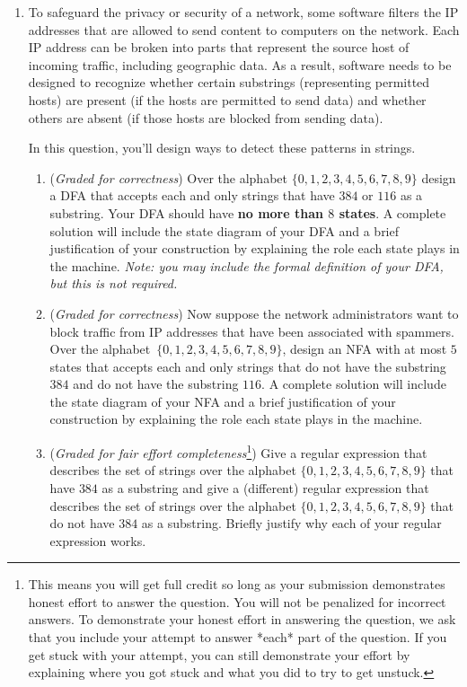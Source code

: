 \documentclass[12pt, oneside]{article}
\begin{document}
\begin{enumerate}
\item  To safeguard the privacy or security of a network, some software filters
the IP addresses that are allowed to send content to computers on the network. Each IP address
can be broken into parts that represent the source host of incoming traffic, including geographic data.
As a result, software needs to be designed to recognize whether certain substrings (representing
permitted hosts) are present (if the hosts are permitted to send data) and whether others
are absent (if those hosts are blocked from sending data).

In this question, you'll design ways to detect these patterns in strings.

\begin{enumerate}
    \item ({\it Graded for correctness})
    Over the alphabet $\{0,1,2,3,4,5,6,7,8,9\}$ design a DFA that accepts each and only strings
    that have $384$ or $116$ as a substring. Your DFA should have {\bf no more than $8$ states}.
    A complete solution will include the state diagram of your DFA and a brief justification of
    your construction by explaining the role each state plays in the machine. {\it Note: you may 
    include the formal definition of your DFA, but this is not required.} 
    \item ({\it Graded for correctness})
    Now suppose the network administrators want to block traffic from IP addresses
    that have been associated with spammers. Over the alphabet~$\{0,1,2,3,4,5,6,7,8,9\}$, 
    design an NFA with at most $5$ states that accepts each and only strings
    that do not have the substring $384$ and do not have the substring $116$. 
    A complete solution will include the state diagram of your NFA and a brief justification 
    of your construction by explaining the role each state plays in the machine.
    \item ({\it Graded for fair effort completeness}\footnote{This means 
    you will get full credit so long as your submission demonstrates honest 
    effort to answer the question. You will not be penalized for incorrect answers. 
    To demonstrate your honest effort in answering the question, we ask that you 
    include your attempt to answer *each* part of the question. If you get stuck 
    with your attempt, you can still demonstrate your effort by explaining where 
    you got stuck and what you did to try to get unstuck.})
    Give a regular expression that describes the set of strings over 
    the alphabet $\{0,1,2,3,4,5,6,7,8,9\}$ that have $384$ as a substring and give
    a (different) regular expression that describes the set of strings over
    the alphabet $\{0,1,2,3,4,5,6,7,8,9\}$ that do not have $384$ as a substring. Briefly justify
    why each of your regular expression works.
\end{enumerate}


\end{enumerate}
\end{document}

